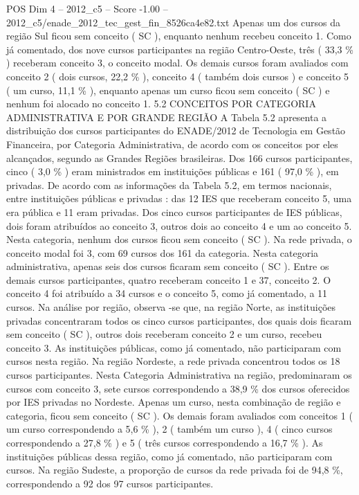 \begin{textsample}{POS Dim 4 – 2012\_c5 – Score -1.00 – 2012\_c5/enade\_2012\_tec\_gest\_fin\_8526ca4e82.txt}
Apenas um dos cursos da região Sul ficou sem conceito ( SC ), enquanto nenhum recebeu conceito 1.
Como já comentado, dos nove cursos participantes na região Centro-Oeste, três ( 33,3 \% ) receberam conceito 3, o conceito modal.
Os demais cursos foram avaliados com conceito 2 ( dois cursos, 22,2 \% ), conceito 4 ( também dois cursos ) e conceito 5 ( um curso, 11,1 \% ), enquanto apenas um curso ficou sem conceito ( SC ) e nenhum foi alocado no conceito 1. 5.2 CONCEITOS POR CATEGORIA ADMINISTRATIVA E POR GRANDE REGIÃO A Tabela 5.2 apresenta a distribuição dos cursos participantes do ENADE/2012 de Tecnologia em Gestão Financeira, por Categoria Administrativa, de acordo com os conceitos por eles alcançados, segundo as Grandes Regiões brasileiras.
Dos 166 cursos participantes, cinco ( 3,0 \% ) eram ministrados em instituições públicas e 161 ( 97,0 \% ), em privadas.
De acordo com as informações da Tabela 5.2, em termos nacionais, entre instituições públicas e privadas : das 12 IES que receberam conceito 5, uma era pública e 11 eram privadas.
Dos cinco cursos participantes de IES públicas, dois foram atribuídos ao conceito 3, outros dois ao conceito 4 e um ao conceito 5.
Nesta categoria, nenhum dos cursos ficou sem conceito ( SC ).
Na rede privada, o conceito modal foi 3, com 69 cursos dos 161 da categoria.
Nesta categoria administrativa, apenas seis dos cursos ficaram sem conceito ( SC ).
Entre os demais cursos participantes, quatro receberam conceito 1 e 37, conceito 2.
O conceito 4 foi atribuído a 34 cursos e o conceito 5, como já comentado, a 11 cursos.
Na análise por região, observa -se que, na região Norte, as instituições privadas concentraram todos os cinco cursos participantes, dos quais dois ficaram sem conceito ( SC ), outros dois receberam conceito 2 e um curso, recebeu conceito 3.
As instituições públicas, como já comentado, não participaram com cursos nesta região.
Na região Nordeste, a rede privada concentrou todos os 18 cursos participantes.
Nesta Categoria Administrativa na região, predominaram os cursos com conceito 3, sete cursos correspondendo a 38,9 \% dos cursos oferecidos por IES privadas no Nordeste.
Apenas um curso, nesta combinação de região e categoria, ficou sem conceito ( SC ).
Os demais foram avaliados com conceitos 1 ( um curso correspondendo a 5,6 \% ), 2 ( também um curso ), 4 ( cinco cursos correspondendo a 27,8 \% ) e 5 ( três cursos correspondendo a 16,7 \% ).
As instituições públicas dessa região, como já comentado, não participaram com cursos.
Na região Sudeste, a proporção de cursos da rede privada foi de 94,8 \%, correspondendo a 92 dos 97 cursos participantes.

\end{textsample}
